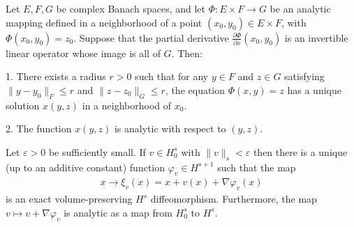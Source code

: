 \documentclass[10pt,a4paper]{amsart}
\begin{document}
\begin{proposition}\label{prop:AIFT_Shnirelman}
  Let $E, F, G$ be complex Banach spaces, and let $\Phi: E \times F \to G$ be an analytic mapping defined in a neighborhood of a point $(x_0, y_0) \in E \times F$, with $\Phi(x_0, y_0) = z_0$. Suppose that the partial derivative $\frac{\partial \Phi}{\partial x} (x_0, y_0)$ is an invertible linear operator whose image is all of $G $. Then:  

1. There exists a radius $r > 0$ such that for any $y \in F$ and $z \in G$ satisfying $\|y - y_0\|_F \leq r$ and $\|z - z_0\|_G \leq r$, the equation $\Phi(x, y) = z$ has a unique solution $x(y, z)$ in a neighborhood of $x_0$.  

2. The function $x(y, z)$ is analytic with respect to $(y, z)$.  
\end{proposition}

 \begin{lemma}
  Let $\varepsilon>0$ be sufficiently small. If $v\in H_0^{s}$ with $\|v\|_s<\varepsilon$ then there is a unique (up to an additive constant) function $\varphi_{v}\in H^{s+1}$ such that the map 
     \begin{align}
     	x\rightarrow \xi_v(x)=x+v(x)+\nabla \varphi_{v}(x)
     \end{align}
 is an exact volume-preserving $H^s$ diffeomorphism. Furthermore, the map $v\mapsto v+\nabla  \varphi_{v}$ is analytic  as a map from $H_0^s$ to $H^s$.
 \end{lemma}
\end{document}
